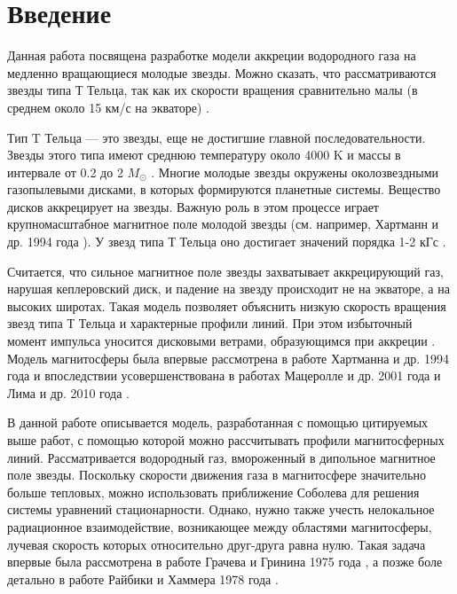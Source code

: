 \documentclass[12pt]{article}
\begin{document}

\section{Введение}


Данная работа посвящена разработке модели аккреции водородного газа на медленно вращающиеся молодые звезды. Можно сказать, что рассматриваются звезды типа Т Тельца, так как их скорости вращения сравнительно малы (в среднем около 15 км/с на экваторе) \cite{petrov03}.

Тип T Тельца --- это звезды, еще не достигшие главной последовательности. Звезды этого типа имеют среднюю температуру около 4000 K и массы в интервале от 0.2 до 2 $M_\odot$ \cite{petrov03}. Многие молодые звезды окружены околозвездными газопылевыми дисками, в которых формируются планетные системы. Вещество дисков аккрецирует на звезды. Важную роль в этом процессе играет крупномасштабное магнитное поле молодой звезды (см. например, Хартманн и др. 1994 года \cite{hartmann94}). У звезд типа Т Тельца оно достигает значений порядка 1-2 кГс \cite{petrov03}.

Считается, что сильное магнитное поле звезды захватывает аккрецирующий газ, нарушая кеплеровский диск, и падение на звезду происходит не на экваторе, а на высоких широтах. Такая модель позволяет объяснить низкую скорость вращения звезд типа Т Тельца и характерные профили линий. При этом избыточный момент импульса уносится дисковыми ветрами, образующимся при аккреции \cite{matt05}. Модель магнитосферы была впервые рассмотрена в работе Хартманна и др. 1994 года \cite{hartmann94} и впоследствии усовершенствована в работах Мацеролле и др. 2001 года \cite{muzerolle01} и Лима и др. 2010 года \cite{lima10}.

В данной работе описывается модель, разработанная с помощью цитируемых выше работ, с помощью которой можно рассчитывать профили магнитосферных линий. Рассматривается водородный газ, вмороженный в дипольное магнитное поле звезды. Поскольку скорости движения газа в магнитосфере значительно больше тепловых, можно использовать приближение Соболева для решения системы уравнений стационарности. Однако, нужно также учесть нелокальное радиационное взаимодействие, возникающее между областями магнитосферы, лучевая скорость которых относительно друг-друга равна нулю. Такая задача впервые была рассмотрена в работе Грачева и Гринина 1975 года \cite{grachev75}, а позже боле детально в работе Райбики и Хаммера 1978 года \cite{rybicki78}. 
\end{document}
